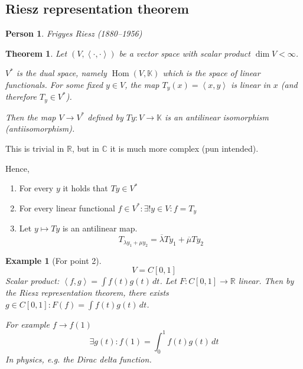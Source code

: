 \documentclass{article}
\newcounter{lecref}[section]
\numberwithin{lecref}{section}
\newtheorem{theorem}[lecref]{Theorem}
\newtheorem{example}[lecref]{Example}
\newtheorem*{person}{Person}
\newcommand{\ip}[2]{\left\langle#1,#2\right\rangle} %
\begin{document}
\subsection{Riesz representation theorem}

\begin{person}
  Frigyes Riesz (1880--1956)
\end{person}

\begin{theorem} %
  Let $(V, \ip{\cdot}{\cdot})$ be a vector space with scalar product $\dim{V} < \infty$.

  $V^*$ is the dual space, namely $\operatorname{Hom}(V, \mathbb K)$ which is the space of linear functionals.
  For some fixed $y \in V$, the map $T_y(x) = \ip{x}{y}$ is linear in $x$ (and therefore $T_y \in V^*$).

  Then the map $V \to V^*$ defined by $Ty: V \to \mathbb K$ is an antilinear isomorphism (antiisomorphism).
\end{theorem}

This is trivial in $\mathbb R$, but in $\mathbb C$ it is much more complex (pun intended).

Hence,
\begin{enumerate}
  \item For every $y$ it holds that $Ty \in V^*$
  \item For every linear functional $f \in V^*: \exists! y \in V: f = T_y$
  \item Let $y \mapsto Ty$ is an antilinear map.
    \[ T_{\lambda y_1 + \mu y_2} = \overline{\lambda} Ty_1 + \overline{\mu} Ty_2 \]
\end{enumerate}

\begin{example}[For point 2]
  \[ V = C[0,1] \]
  Scalar product: $\ip fg = \int f(t) g(t) \, dt$.
  Let $F: C[0,1] \to \mathbb R$ linear.
  Then by the Riesz representation theorem,
  there exists $g \in C[0,1]: F(f) = \int f(t) g(t) \, dt$.

  For example $f \to f(1)$
  \[ \exists g(t): f(1) = \int_0^1 f(t) g(t) \, dt \]
  In physics, e.g. the Dirac delta function.
\end{example}
\end{document}
